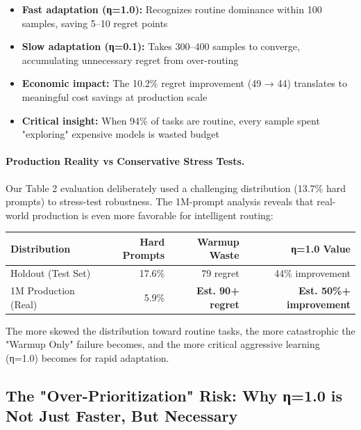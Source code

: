 \begin{itemize}[leftmargin=*,nosep]
    \item \textbf{Fast adaptation (η=1.0):} Recognizes routine dominance within 100 samples, saving 5--10 regret points
    \item \textbf{Slow adaptation (η=0.1):} Takes 300--400 samples to converge, accumulating unnecessary regret from over-routing
    \item \textbf{Economic impact:} The 10.2\% regret improvement (49 → 44) translates to meaningful cost savings at production scale
    \item \textbf{Critical insight:} When 94\% of tasks are routine, every sample spent "exploring" expensive models is wasted budget
\end{itemize}

\paragraph{Production Reality vs Conservative Stress Tests.}
Our Table 2 evaluation deliberately used a challenging distribution (13.7\% hard prompts) to stress-test robustness. The 1M-prompt analysis reveals that real-world production is even more favorable for intelligent routing:

\vspace{0.5em}
\begin{center}
\small
\begin{tabular}{@{}lrrr@{}}
\toprule
\textbf{Distribution} & \textbf{Hard Prompts} & \textbf{Warmup Waste} & \textbf{η=1.0 Value} \\
\midrule
Holdout (Test Set) & 17.6\% & 79 regret & 44\% improvement \\
1M Production (Real) & 5.9\% & \textbf{Est. 90+ regret} & \textbf{Est. 50\%+ improvement} \\
\bottomrule
\end{tabular}
\end{center}
\vspace{0.5em}

The more skewed the distribution toward routine tasks, the more catastrophic the "Warmup Only" failure becomes, and the more critical aggressive learning (η=1.0) becomes for rapid adaptation.

\subsection{The "Over-Prioritization" Risk: Why η=1.0 is Not Just Faster, But Necessary}

